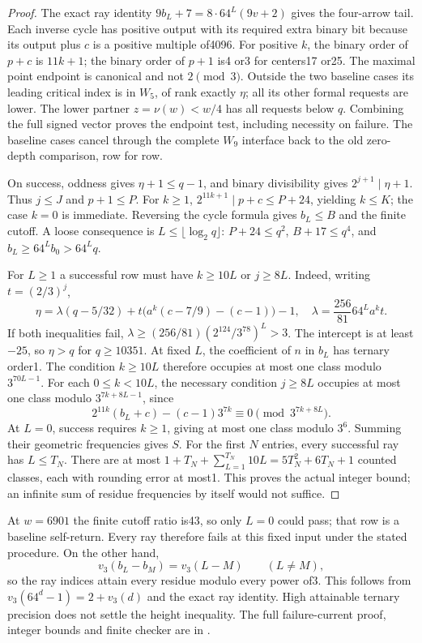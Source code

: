 \documentclass[11pt]{article}
\begin{document}
\begin{proof}
The exact ray identity $9b_L+7=8\cdot64^L(9v+2)$ gives the four-arrow
tail. Each inverse cycle has positive output with its required extra
binary bit because its output plus $c$ is a positive multiple of4096.
For positive $k$, the binary order of $p+c$ is $11k+1$; the binary
order of $p+1$ is4 or3 for centers17 or25. The maximal point endpoint
is canonical and not $2\pmod3$. Outside the two baseline cases its
leading critical index is in $W_5$, of rank exactly $\eta$; all its
other formal requests are lower. The lower partner $z=\nu(w)<w/4$
has all requests below $q$. Combining the full signed vector proves
the endpoint test, including necessity on failure. The baseline cases
cancel through the complete $W_9$ interface back to the old zero-depth
comparison, row for row.

On success, oddness gives $\eta+1\le q-1$, and binary divisibility gives
$2^{j+1}\mid\eta+1$. Thus $j\le J$ and $p+1\le P$. For $k\ge1$,
$2^{11k+1}\mid p+c\le P+24$, yielding $k\le K$; the case $k=0$
is immediate. Reversing the cycle formula gives $b_L\le B$ and the
finite cutoff. A loose consequence is $L\le\lfloor\log_2q\rfloor$:
$P+24\le q^2$, $B+17\le q^4$, and $b_L\ge64^Lb_0>64^Lq$.

For $L\ge1$ a successful row must have $k\ge10L$ or $j\ge8L$.
Indeed, writing $t=(2/3)^j$,
\[
 \eta=\lambda(q-5/32)
       +t\bigl(a^k(c-7/9)-(c-1)\bigr)-1,
 \quad \lambda=\frac{256}{81}64^La^kt.
\]
If both inequalities fail, $\lambda\ge(256/81)(2^{124}/3^{78})^L>3$.
The intercept is at least $-25$, so $\eta>q$ for $q\ge10351$.
At fixed $L$, the coefficient of $n$ in $b_L$ has ternary order1.
The condition $k\ge10L$ therefore occupies at most one class modulo
$3^{70L-1}$. For each $0\le k<10L$, the necessary condition $j\ge8L$
occupies at most one class modulo $3^{7k+8L-1}$, since
\[
 2^{11k}(b_L+c)-(c-1)3^{7k}\equiv0\pmod{3^{7k+8L}}.
\]
At $L=0$, success requires $k\ge1$, giving at most one class modulo
$3^6$. Summing their geometric frequencies gives $S$. For the first
$N$ entries, every successful ray has $L\le T_N$. There are at most
$1+T_N+\sum_{L=1}^{T_N}10L=5T_N^2+6T_N+1$ counted classes, each with
rounding error at most1. This proves the actual integer bound; an
infinite sum of residue frequencies by itself would not suffice.
\end{proof}

At $w=6901$ the finite cutoff ratio is43, so only $L=0$ could pass;
that row is a baseline self-return. Every ray therefore fails at this
fixed input under the stated procedure. On the other hand,
\[
 v_3(b_L-b_M)=v_3(L-M)\qquad(L\ne M),
\]
so the ray indices attain every residue modulo every power of3.
This follows from $v_3(64^d-1)=2+v_3(d)$ and the exact ray identity.
High attainable ternary precision does not settle the height inequality.
The full failure-current proof, integer bounds and finite checker are in
.
\end{document}
